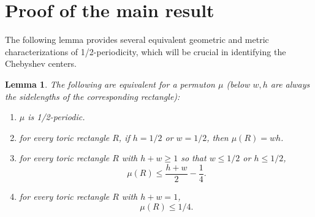 \documentclass{article}
\newtheorem{lemma}[theorem]{Lemma}
\theoremstyle{definition}
\begin{document}
\section{Proof of the main result} \label{sec:main}

The following lemma provides several equivalent geometric and metric characterizations of 1/2-periodicity, which will be crucial in identifying the Chebyshev centers.

\begin{lemma}\label{lemma:1/2_periodicity_equivalence}
    The following are equivalent for a permuton $\mu$ (below $w, h$ are always the sidelengths of the corresponding rectangle):
    \begin{enumerate}
        \item[(i)] $\mu$ is 1/2-periodic.
        \item[(ii)] for every toric rectangle $R$, if $h=1/2$ or $w=1/2$, then $\mu(R)=wh$.
        \item[(iii)] for every toric rectangle $R$ with $h+w\geq 1$ so that $w\leq 1/2$ or $h\leq 1/2$,
        $$\mu(R)\leq \frac{h+w}{2}-\frac{1}{4}.$$
        \item[(iv)] for every toric rectangle $R$ with $h+w=1$,
        $$\mu(R)\leq 1/4.$$
    \end{enumerate}
\end{lemma}
\end{document}
